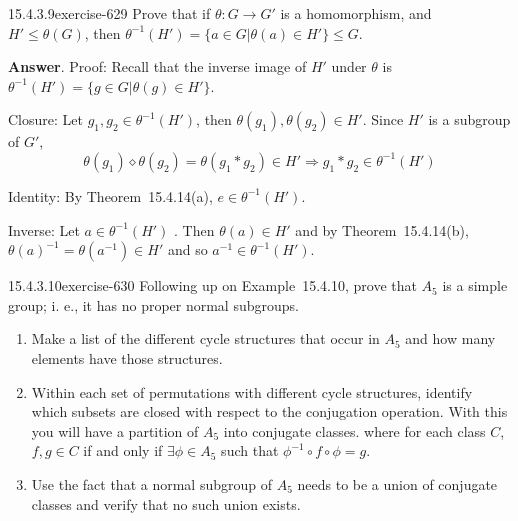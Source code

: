 \documentclass[twoside,10pt,]{book}
\numberwithin{equation}{section}
\begin{document}
\begin{divisionsolution}{15.4.3.9}{}{exercise-629}%
\hypertarget{p-5615}{}%
Prove that if \(\theta : G \rightarrow  G'\) is a homomorphism, and \(H' \leq  \theta(G)\), then \(\theta^{-1}(H') =\{a\in G| \theta
(a)\in H'\}\leq  G\).%
\par\smallskip%
\noindent\textbf{Answer}.\quad%
\hypertarget{p-5616}{}%
Proof: Recall that the inverse image of \(H'\) under \(\theta\) is \(\theta ^{-1}(H')=\{g\in G | \theta (g)\in H'\}\).%
\par
\hypertarget{p-5617}{}%
Closure:   Let \(g_1, g_2\in \theta ^{-1}(H')\), then \(\theta \left(g_1\right),\theta \left(g_2\right)\in H'\).  Since \(H'\) is a subgroup of \(G'\),%
\begin{equation*}
\theta\left(g_1\right)\diamond \theta\left(g_2\right)=\theta\left(g_1*g_2\right)\in H' \Rightarrow  g_1*g_2\in \theta^{-1}(H')
\end{equation*}
%
\par
\hypertarget{p-5618}{}%
Identity: By Theorem~15.4.14(a), \(e \in \theta ^{-1}(H')\).%
\par
\hypertarget{p-5619}{}%
Inverse: Let \(a\in \theta ^{-1}(H')\) . Then \(\theta (a)\in H'\) and by Theorem~15.4.14(b), \(\theta (a)^{-1}= \theta \left(a^{-1}\right)\in H'\) and so \(a^{-1}\in \theta ^{-1}(H')\).%
\end{divisionsolution}%
\begin{divisionsolution}{15.4.3.10}{}{exercise-630}%
\hypertarget{p-5620}{}%
Following up on Example~15.4.10,  prove that \(A_5\) is a simple group; i. e., it has no proper normal subgroups.\leavevmode%
\begin{enumerate}[label=(\alph*)]
\item\hypertarget{li-2480}{}\hypertarget{p-5621}{}%
Make a list of  the different cycle structures that occur in \(A_5\) and how many elements have those structures.%
\item\hypertarget{li-2481}{}\hypertarget{p-5622}{}%
Within each set of permutations with different cycle structures, identify which subsets are closed with respect to the conjugation operation. With this you will have a partition of \(A_5\) into conjugate classes.  where for each class \(C\), \(f, g\in  C\)   if and only if   \(\exists  \phi  \in A_5\)  such that  \(\phi ^{-1}\circ f\circ  \phi  = g\).%
\item\hypertarget{li-2482}{}\hypertarget{p-5623}{}%
Use the fact that a normal subgroup of \(A_5\) needs to be a union of conjugate classes and verify that no such union exists.%
\end{enumerate}
%
\end{divisionsolution}%
\end{document}
